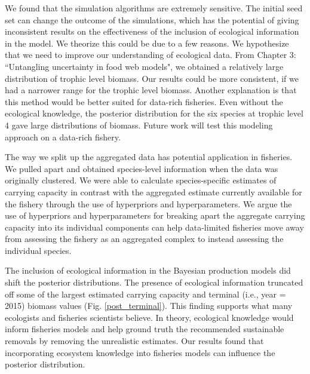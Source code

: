 \documentclass[oneside,12pt,final]{sty/ucthesis-CA2012}
\begin{document}
\begin{mainmatter}
\vspace{5mm}

We found that the simulation algorithms are extremely sensitive. The initial seed set can change the outcome of the simulations, which has the potential of giving inconsistent results on the effectiveness of the inclusion of ecological information in the model. We theorize this could be due to a few reasons. We hypothesize that we need to improve our understanding of ecological data. From Chapter 3: ``Untangling uncertainty in food web models", we obtained a relatively large distribution of trophic level biomass. Our results could be more consistent, if we had a narrower range for the trophic level biomass. Another explanation is that this method would be better suited for data-rich fisheries. Even without the ecological knowledge, the posterior distribution for the six species at trophic level 4 gave large distributions of biomass. Future work will test this modeling approach on a data-rich fishery.

\vspace{5mm}

The way we split up the aggregated data has potential application in fisheries. We pulled apart and obtained species-level information when the data was originally clustered. We were able to calculate species-specific estimates of carrying capacity in contrast with the aggregated estimate currently available for the fishery through the use of hyperpriors and hyperparameters. We argue the use of hyperpriors and hyperparameters for breaking apart the aggregate carrying capacity into its individual components can help data-limited fisheries move away from assessing the fishery as an aggregated complex to instead assessing the individual species. 

\vspace{5mm}
 
The inclusion of ecological information in the Bayesian production models did  shift the posterior distributions. The presence of ecological information truncated off some of the largest estimated carrying capacity and terminal (i.e., year = 2015) biomass values (Fig. \ref{post_terminal}). This finding  supports what many ecologists and fisheries scientists believe. In theory, ecological knowledge would inform fisheries models and help ground truth the recommended sustainable removals by removing the unrealistic estimates. Our results found that incorporating ecosystem knowledge into fisheries models can influence the posterior distribution.
 

\end{mainmatter}
\end{document}
